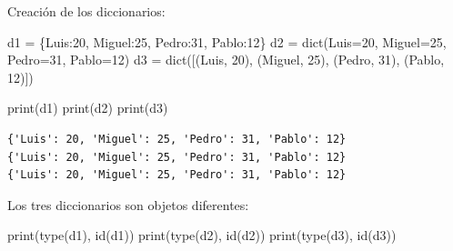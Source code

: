 \documentclass[
  spanish,
  letterpaper,
]{scrbook}
\newenvironment{Shaded}{\begin{snugshade}}{\end{snugshade}}
\newcommand{\BuiltInTok}[1]{\textcolor[rgb]{0.00,0.23,0.31}{#1}}
\newcommand{\DecValTok}[1]{\textcolor[rgb]{0.68,0.00,0.00}{#1}}
\newcommand{\NormalTok}[1]{\textcolor[rgb]{0.00,0.23,0.31}{#1}}
\newcommand{\OperatorTok}[1]{\textcolor[rgb]{0.37,0.37,0.37}{#1}}
\newcommand{\StringTok}[1]{\textcolor[rgb]{0.13,0.47,0.30}{#1}}
\theoremstyle{definition}
\theoremstyle{remark}
\begin{document}
Creación de los diccionarios:

\begin{Shaded}
\begin{Highlighting}[]
\NormalTok{d1 }\OperatorTok{=}\NormalTok{ \{}\StringTok{\textquotesingle{}Luis\textquotesingle{}}\NormalTok{:}\DecValTok{20}\NormalTok{, }\StringTok{\textquotesingle{}Miguel\textquotesingle{}}\NormalTok{:}\DecValTok{25}\NormalTok{, }\StringTok{\textquotesingle{}Pedro\textquotesingle{}}\NormalTok{:}\DecValTok{31}\NormalTok{, }\StringTok{\textquotesingle{}Pablo\textquotesingle{}}\NormalTok{:}\DecValTok{12}\NormalTok{\}}
\NormalTok{d2 }\OperatorTok{=} \BuiltInTok{dict}\NormalTok{(Luis}\OperatorTok{=}\DecValTok{20}\NormalTok{, Miguel}\OperatorTok{=}\DecValTok{25}\NormalTok{, Pedro}\OperatorTok{=}\DecValTok{31}\NormalTok{, Pablo}\OperatorTok{=}\DecValTok{12}\NormalTok{)}
\NormalTok{d3 }\OperatorTok{=} \BuiltInTok{dict}\NormalTok{([(}\StringTok{\textquotesingle{}Luis\textquotesingle{}}\NormalTok{, }\DecValTok{20}\NormalTok{), }
\NormalTok{           (}\StringTok{\textquotesingle{}Miguel\textquotesingle{}}\NormalTok{, }\DecValTok{25}\NormalTok{), }
\NormalTok{           (}\StringTok{\textquotesingle{}Pedro\textquotesingle{}}\NormalTok{, }\DecValTok{31}\NormalTok{), }
\NormalTok{           (}\StringTok{\textquotesingle{}Pablo\textquotesingle{}}\NormalTok{, }\DecValTok{12}\NormalTok{)])}
\end{Highlighting}
\end{Shaded}

\begin{Shaded}
\begin{Highlighting}[]
\BuiltInTok{print}\NormalTok{(d1)}
\BuiltInTok{print}\NormalTok{(d2)}
\BuiltInTok{print}\NormalTok{(d3)}
\end{Highlighting}
\end{Shaded}

\begin{verbatim}
{'Luis': 20, 'Miguel': 25, 'Pedro': 31, 'Pablo': 12}
{'Luis': 20, 'Miguel': 25, 'Pedro': 31, 'Pablo': 12}
{'Luis': 20, 'Miguel': 25, 'Pedro': 31, 'Pablo': 12}
\end{verbatim}

Los tres diccionarios son objetos diferentes:

\begin{Shaded}
\begin{Highlighting}[]
\BuiltInTok{print}\NormalTok{(}\BuiltInTok{type}\NormalTok{(d1), }\BuiltInTok{id}\NormalTok{(d1))}
\BuiltInTok{print}\NormalTok{(}\BuiltInTok{type}\NormalTok{(d2), }\BuiltInTok{id}\NormalTok{(d2))}
\BuiltInTok{print}\NormalTok{(}\BuiltInTok{type}\NormalTok{(d3), }\BuiltInTok{id}\NormalTok{(d3))}
\end{Highlighting}
\end{Shaded}
\end{document}
